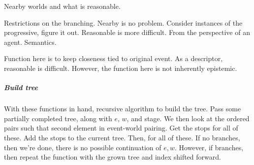 \begin{note}[Reasonable]
  Nearby worlds and what is reasonable.

  Restrictions on the branching.
  Nearby is no problem.
  Consider instances of the progressive, figure it out.
  Reasonable is more difficult.
  From the perspective of an agent.
  Semantics.

  Function here is to keep closeness tied to original event.
  As a descriptor, reasonable is difficult.
  However, the function here is not inherently epistemic.
\end{note}

\subparagraph{Build tree}

\begin{note}
  With these functions in hand, recursive algorithm to build the tree.
  Pass some partially completed tree, along with \(e\), \(w\), and stage.
  We then look at the ordered pairs such that second element in event-world pairing.
  Get the stops for all of these.
  Add the stops to the current tree.
  Then, \AlgFindBranches{} for all of these.
  If no branches, then we're done, there is no possible continuation of \(e,w\).
  However, if branches, then repeat the function with the grown tree and index shifted forward.

  \begin{algorithm}[H]
    \SetAlgoLined
    \DontPrintSemicolon
    \caption{\AlgDevelopTree{}\label{PrAl:dev-tree}}
  \end{algorithm}


\end{note}
